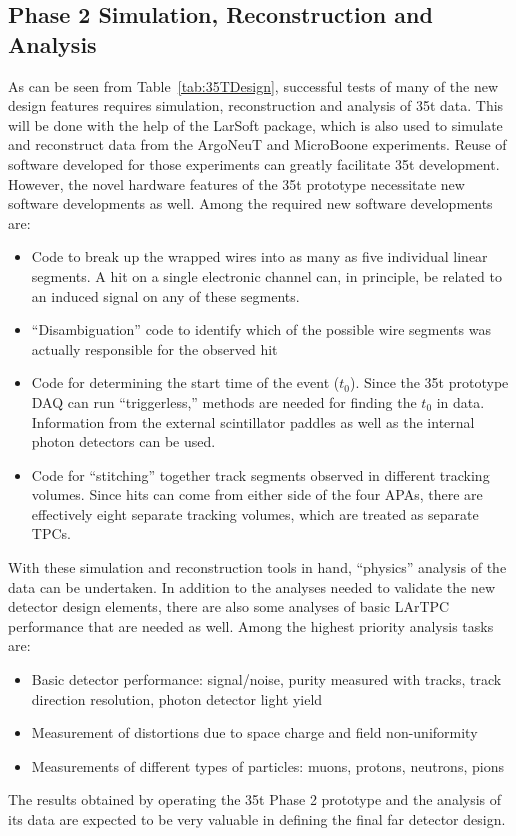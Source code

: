 \subsection{Phase 2 Simulation, Reconstruction and Analysis}
As can be seen from Table~\ref{tab:35TDesign}, successful tests of many of the new 
design features requires simulation, reconstruction and analysis of 35t data. 
This will be done with the help of the LarSoft package, which is also used to simulate and 
reconstruct data from the ArgoNeuT and MicroBoone experiments.
Reuse of software developed for those experiments can greatly facilitate 35t development. 
However, the novel hardware features of the 35t prototype necessitate new software developments 
as well.  
Among the required new software developments are:
\begin{itemize}
\item{Code to break up the wrapped wires into as many as five individual linear segments. 
A hit on a single electronic channel can, in principle, be related to an induced signal on any of these segments.}
\item{``Disambiguation'' code to identify which of the possible wire segments was actually responsible
for the observed hit}
\item{Code for determining the start time of the event ($t_0$). Since the 35t prototype DAQ can
run ``triggerless,'' methods are needed for finding the $t_0$ in data. Information from the external 
scintillator paddles as well as the internal photon detectors can be used.}
\item{Code for ``stitching'' together track segments observed in different tracking volumes. 
Since hits can come from either side of the four APAs, there are effectively eight separate tracking volumes, 
which are treated as separate TPCs.}
\end{itemize}

With these simulation and reconstruction tools in hand, ``physics'' analysis of the data can be undertaken.
In addition to the analyses needed to validate the new detector design elements, there are also
some analyses of basic LArTPC performance that are needed as well.
Among the highest priority analysis tasks are:

\begin{itemize}
\item{Basic detector performance: signal/noise, purity measured with tracks, track direction resolution, 
photon detector light yield}
\item{Measurement of distortions due to space charge and field non-uniformity}
\item{Measurements of different types of particles: muons, protons, neutrons, pions}
\end{itemize}

The results obtained by operating the 35t Phase 2 prototype and the analysis of its data are expected
to be very valuable in defining the final far detector design. 
